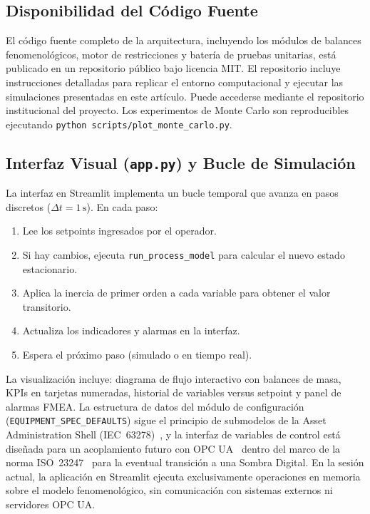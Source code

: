 \documentclass[10pt,letterpaper,twocolumn]{article}
\begin{document}
\subsection{Disponibilidad del Código Fuente}

El c\'odigo fuente completo de la arquitectura, incluyendo los módulos de balances fenomenológicos, motor de restricciones y batería de pruebas unitarias, está publicado en un repositorio público bajo licencia MIT. El repositorio incluye instrucciones detalladas para replicar el entorno computacional y ejecutar las simulaciones presentadas en este artículo. Puede accederse mediante el repositorio institucional del proyecto. Los experimentos de Monte Carlo son reproducibles ejecutando \texttt{python scripts/plot\_monte\_carlo.py}.

\subsection{Interfaz Visual (\texttt{app.py}) y Bucle de Simulación}

La interfaz en Streamlit implementa un bucle temporal que avanza en pasos discretos ($\Delta t = 1\,\text{s}$). En cada paso:

\begin{enumerate}
    \item Lee los setpoints ingresados por el operador.
    \item Si hay cambios, ejecuta \texttt{run\_process\_model} para calcular el nuevo estado estacionario.
    \item Aplica la inercia de primer orden a cada variable para obtener el valor transitorio.
    \item Actualiza los indicadores y alarmas en la interfaz.
    \item Espera el próximo paso (simulado o en tiempo real).
\end{enumerate}

La visualización incluye: diagrama de flujo interactivo con balances de masa, KPIs en tarjetas numeradas, historial de variables versus setpoint y panel de alarmas FMEA. La estructura de datos del módulo de configuración (\texttt{EQUIPMENT\_SPEC\_DEFAULTS}) sigue el principio de submodelos de la Asset Administration Shell (IEC~63278)~\cite{iec63278}, y la interfaz de variables de control está diseñada para un acoplamiento futuro con OPC UA~\cite{opcfoundation2022} dentro del marco de la norma ISO~23247~\cite{iso23247} para la eventual transición a una Sombra Digital. En la sesión actual, la aplicación en Streamlit ejecuta exclusivamente operaciones en memoria sobre el modelo fenomenológico, sin comunicación con sistemas externos ni servidores OPC UA.
\end{document}
